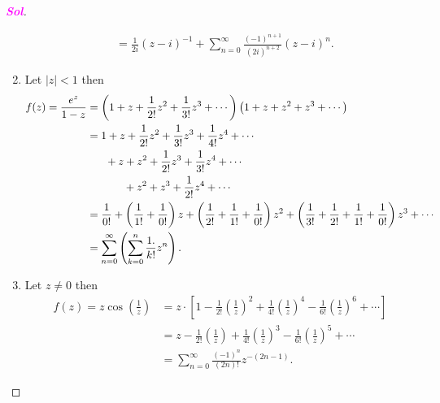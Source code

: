 \documentclass{article}
\theoremstyle{definition}
\newcommand{\of}[1]{\left( #1 \right)}
\newcommand{\abs}[1]{\left\lvert #1 \right\rvert}
\newcommand{\sol}{\textcolor{magenta}{\bf Sol}}
\begin{document}
\begin{proof}[\sol]
\begin{enumerate}[(1)]
\begin{align*}
				&=\frac{1}{2i}(z-i)^{-1}+\sum_{n=0}^\infty\frac{(-1)^{n+1}}{(2i)^{n+2}}(z-i)^n.
			\end{align*}
			\item Let $\abs{z}<1$ then \begin{align*}
				f(z)=\frac{e^z}{1-z}&=\of{1+z+\frac{1}{2!}z^2+\frac{1}{3!}z^3+\cdots}\of{1+z+z^2+z^3+\cdots}\\
				&=1+z+\frac{1}{2!}z^2+\frac{1}{3!}z^3+\frac{1}{4!}z^4+\cdots\\
				&\hspace{6mm}+z+z^2+\frac{1}{2!}z^3+\frac{1}{3!}z^4+\cdots\\
				&\hspace{12mm}+z^2+z^3+\frac{1}{2!}z^4+\cdots\\
				&=\frac{1}{0!}+\of{\frac{1}{1!}+\frac{1}{0!}}z+\of{\frac{1}{2!}+\frac{1}{1!}+\frac{1}{0!}}z^2+\of{\frac{1}{3!}+\frac{1}{2!}+\frac{1}{1!}+\frac{1}{0!}}z^3+\cdots\\
				&=\sum_{n=0}^\infty\of{\sum_{k=0}^n\frac{1.}{k!}z^n}.
			\end{align*}
			\item Let $z\neq 0$ then \begin{align*}
				f(z) = z\cos\of{\frac{1}{z}}&=z\cdot\left[1-\frac{1}{2!}\of{\frac{1}{z}}^2+\frac{1}{4!}\of{\frac{1}{z}}^4-\frac{1}{6!}\of{\frac{1}{z}}^6+\cdots\right]\\
				&=z-\frac{1}{2!}\of{\frac{1}{z}}+\frac{1}{4!}\of{\frac{1}{z}}^3-\frac{1}{6!}\of{\frac{1}{z}}^5+\cdots\\
				&=\sum_{n=0}^\infty\frac{(-1)^n}{(2n)!}z^{-(2n-1)}.
			\end{align*}
		\end{enumerate}
	\end{proof}
	\vspace{8pt}
	
\end{document}
